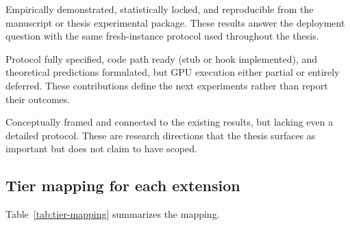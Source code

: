 \begin{description}[leftmargin=1.4em,style=nextline]
    \item[\textbf{Core contribution.}]  Empirically demonstrated, statistically locked, and reproducible from the manuscript or thesis experimental package.  These results answer the deployment question with the same fresh-instance protocol used throughout the thesis.
    \item[\textbf{Extended contribution.}]  Protocol fully specified, code path ready (stub or hook implemented), and theoretical predictions formulated, but GPU execution either partial or entirely deferred.  These contributions define the next experiments rather than report their outcomes.
    \item[\textbf{Future contribution.}]  Conceptually framed and connected to the existing results, but lacking even a detailed protocol.  These are research directions that the thesis surfaces as important but does not claim to have scoped.
\end{description}

\subsection{Tier mapping for each extension}

Table~\ref{tab:tier-mapping} summarizes the mapping.

